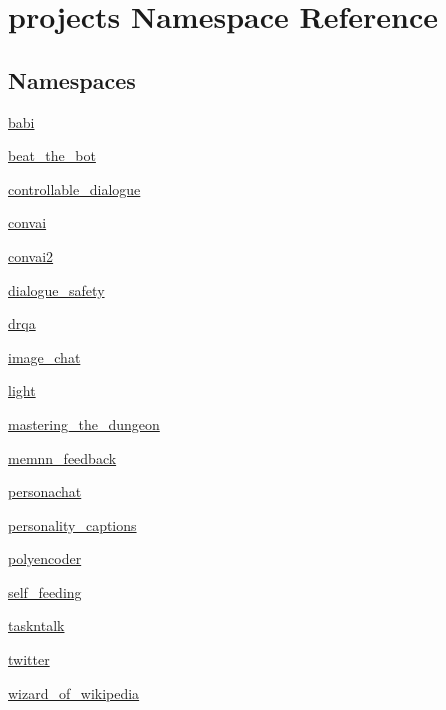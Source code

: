 \hypertarget{namespaceprojects}{}\section{projects Namespace Reference}
\label{namespaceprojects}
\subsection*{Namespaces}
\begin{DoxyCompactItemize}
\item 
 \hyperlink{namespaceprojects_1_1babi}{babi}
\item 
 \hyperlink{namespaceprojects_1_1beat__the__bot}{beat\+\_\+the\+\_\+bot}
\item 
 \hyperlink{namespaceprojects_1_1controllable__dialogue}{controllable\+\_\+dialogue}
\item 
 \hyperlink{namespaceprojects_1_1convai}{convai}
\item 
 \hyperlink{namespaceprojects_1_1convai2}{convai2}
\item 
 \hyperlink{namespaceprojects_1_1dialogue__safety}{dialogue\+\_\+safety}
\item 
 \hyperlink{namespaceprojects_1_1drqa}{drqa}
\item 
 \hyperlink{namespaceprojects_1_1image__chat}{image\+\_\+chat}
\item 
 \hyperlink{namespaceprojects_1_1light}{light}
\item 
 \hyperlink{namespaceprojects_1_1mastering__the__dungeon}{mastering\+\_\+the\+\_\+dungeon}
\item 
 \hyperlink{namespaceprojects_1_1memnn__feedback}{memnn\+\_\+feedback}
\item 
 \hyperlink{namespaceprojects_1_1personachat}{personachat}
\item 
 \hyperlink{namespaceprojects_1_1personality__captions}{personality\+\_\+captions}
\item 
 \hyperlink{namespaceprojects_1_1polyencoder}{polyencoder}
\item 
 \hyperlink{namespaceprojects_1_1self__feeding}{self\+\_\+feeding}
\item 
 \hyperlink{namespaceprojects_1_1taskntalk}{taskntalk}
\item 
 \hyperlink{namespaceprojects_1_1twitter}{twitter}
\item 
 \hyperlink{namespaceprojects_1_1wizard__of__wikipedia}{wizard\+\_\+of\+\_\+wikipedia}
\end{DoxyCompactItemize}
